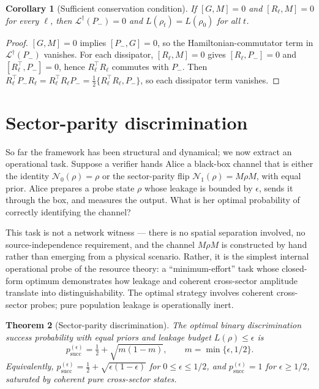\documentclass[a4paper,onecolumn,noarxiv]{quantumarticle}
\theoremstyle{plain}
\newtheorem{theorem}{Theorem}
\newtheorem{corollary}[theorem]{Corollary}
\theoremstyle{definition}
\theoremstyle{remark}
\newcommand{\Pminus}{P_{-}}
\newcommand{\Mop}{M}
\newcommand{\Ldag}{\mathcal{L}^{\dagger}}
\newcommand{\Lleak}{L}
\begin{document}
\begin{corollary}[Sufficient conservation condition]
\label{cor:lindblad}
If $[G,\Mop]=0$ and $[R_\ell,\Mop]=0$ for every $\ell$, then $\Ldag(\Pminus)=0$
and $\Lleak(\rho_t)=\Lleak(\rho_0)$ for all $t$.
\end{corollary}

\begin{proof}
$[G,\Mop]=0$ implies $[\Pminus,G]=0$, so the Hamiltonian-commutator term in
$\Ldag(\Pminus)$ vanishes. For each dissipator, $[R_\ell,\Mop]=0$ gives
$[R_\ell,\Pminus]=0$ and $[R_\ell^\top,\Pminus]=0$, hence
$R_\ell^\top R_\ell$ commutes with $\Pminus$. Then
$R_\ell^\top\Pminus R_\ell=R_\ell^\top R_\ell\Pminus
=\tfrac{1}{2}\{R_\ell^\top R_\ell,\Pminus\}$, so each dissipator term vanishes.
\end{proof}

\section{Sector-parity discrimination}
\label{sec:discrimination}

So far the framework has been structural and dynamical; we now extract an operational
task. Suppose a verifier hands Alice a black-box channel that is either the identity
$\mathcal{N}_0(\rho)=\rho$ or the sector-parity flip $\mathcal{N}_1(\rho)=\Mop\rho\Mop$,
with equal prior. Alice prepares a probe state $\rho$ whose leakage is bounded by
$\epsilon$, sends it through the box, and measures the output. What is her optimal
probability of correctly identifying the channel?

This task is not a network witness --- there is no spatial separation involved, no
source-independence requirement, and the channel $\Mop\rho\Mop$ is constructed by
hand rather than emerging from a physical scenario. Rather, it is the simplest
internal operational probe of the resource theory: a ``minimum-effort'' task whose
closed-form optimum demonstrates how leakage and coherent cross-sector amplitude
translate into distinguishability. The optimal strategy involves coherent cross-sector
probes; pure population leakage is operationally inert.

\begin{theorem}[Sector-parity discrimination]
\label{thm:discrimination}
The optimal binary discrimination success probability with equal priors and leakage
budget $\Lleak(\rho)\le\epsilon$ is
\begin{equation}
  p_{\mathrm{succ}}^{(\epsilon)} = \tfrac{1}{2}+\sqrt{m(1-m)},\qquad
  m=\min\{\epsilon,1/2\}.
\end{equation}
Equivalently, $p_{\mathrm{succ}}^{(\epsilon)}=\tfrac{1}{2}+\sqrt{\epsilon(1-\epsilon)}$
for $0\le\epsilon\le 1/2$, and $p_{\mathrm{succ}}^{(\epsilon)}=1$ for
$\epsilon\ge 1/2$, saturated by coherent pure cross-sector states.
\end{theorem}
\end{document}
